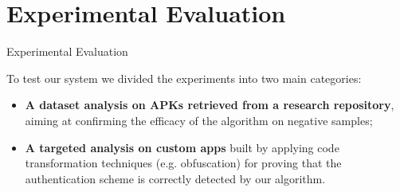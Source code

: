 \documentclass[10pt]{beamer}
\begin{document}




 
 


\section{Experimental Evaluation}
\begin{frame}[fragile]{Experimental Evaluation}

  To test our system we divided the experiments into two main categories:
  \begin{itemize}

  \item {\bf A dataset analysis on APKs retrieved from a research
    repository}, aiming at confirming the efficacy of the
    algorithm on negative samples;

  \item {\bf A targeted analysis on custom apps} built by applying
    code transformation techniques (e.g. obfuscation) for proving that
    the authentication scheme is correctly detected by our algorithm.
      
  \end{itemize}
	
\end{frame}
\end{document}
